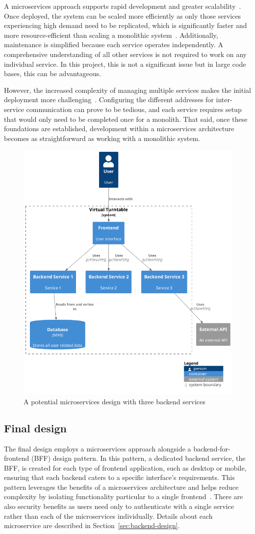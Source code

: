 A microservices approach supports rapid development and greater scalability~\cite{Dragoni2017}. Once deployed, the system can be scaled more efficiently as only those services experiencing high demand need to be replicated, which is significantly faster and more resource-efficient than scaling a monolithic system~\cite{9717259}. Additionally, maintenance is simplified because each service operates independently. A comprehensive understanding of all other services is not required to work on any individual service. In this project, this is not a significant issue but in large code bases, this can be advantageous.

However, the increased complexity of managing multiple services makes the initial deployment more challenging~\cite{9717259}. Configuring the different addresses for inter-service communication can prove to be tedious, and each service requires setup that would only need to be completed once for a monolith. That said, once these foundations are established, development within a microservices architecture becomes as straightforward as working with a monolithic system.

\begin{figure} [H]
    \centering
    \includegraphics[width=0.4\linewidth]{figures/microservices_arch.png}
    \caption{A potential microservices design with three backend services}
    \label{fig:microservices-arch}
\end{figure}

\subsection{Final design}
The final design employs a microservices approach alongside a backend-for-frontend (BFF) design pattern. In this pattern, a dedicated backend service, the BFF, is created for each type of frontend application, such as desktop or mobile, ensuring that each backend caters to a specific interface’s requirements. This pattern leverages the benefits of a microservices architecture and helps reduce complexity by isolating functionality particular to a single frontend~\cite{BFF}. There are also security benefits as users need only to authenticate with a single service rather than each of the microservices individually. Details about each microservice are described in Section~\ref{sec:backend-design}.

